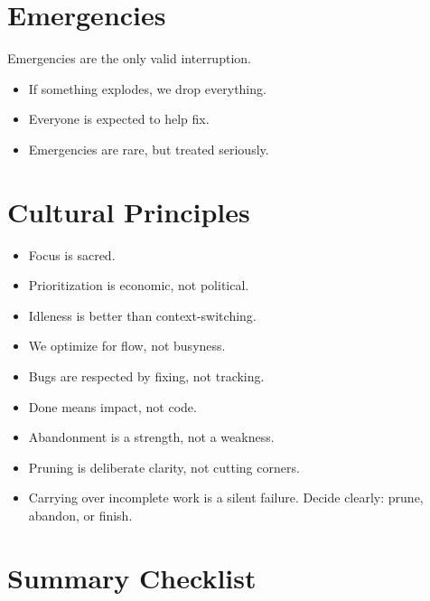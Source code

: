 \documentclass[a4paper]{article}
\begin{document}
\section{Emergencies}

Emergencies are the only valid interruption.

\begin{itemize}
    \item  If something explodes, we drop everything.
    \item  Everyone is expected to help fix.
    \item  Emergencies are rare, but treated seriously.
\end{itemize}

\section{Cultural Principles}

\begin{itemize}
    \item Focus is sacred.
    \item Prioritization is economic, not political.
    \item Idleness is better than context-switching.
    \item We optimize for flow, not busyness.
    \item Bugs are respected by fixing, not tracking.
    \item Done means impact, not code.
    \item Abandonment is a strength, not a weakness.
    \item Pruning is deliberate clarity, not cutting corners.
    \item Carrying over incomplete work is a silent failure. Decide clearly: prune, abandon, or finish.
\end{itemize}

\section{Summary Checklist}
\end{document}

